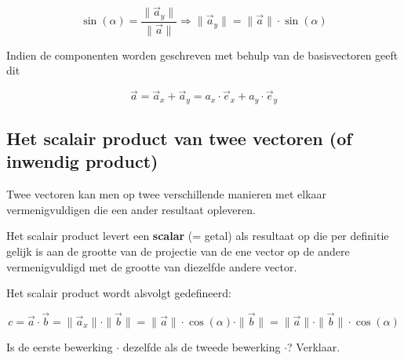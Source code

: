 \documentclass{ximera}
\begin{document}
\[
\sin(\alpha) = \frac{\| \vec{a}_y \|}{\| \vec{a} \|} \Rightarrow \| \vec{a}_y \| = \|\vec{a}\| \cdot \sin(\alpha)
\]

\begin{image}[0.3\textwidth]
\end{image}

Indien de componenten worden geschreven met behulp van de basisvectoren geeft dit 


$$
\vec{a} = \vec{a}_x + \vec{a}_y = a_x \cdot \vec{e}_x + a_y \cdot \vec{e}_y 
$$


\subsection*{Het scalair product van twee vectoren (of inwendig product)}

Twee vectoren kan men op twee verschillende manieren met elkaar vermenigvuldigen die een ander resultaat opleveren. 

Het scalair product levert een \textbf{scalar} (= getal) als resultaat op die per definitie gelijk is aan de grootte van de projectie van de ene vector op de andere vermenigvuldigd met de grootte van diezelfde andere vector. 

Het scalair product wordt alsvolgt gedefineerd: 

$$
c = \vec{a} \cdot \vec{b} = \| \vec{a}_x \| \cdot \|\vec{b}\| = \|\vec{a}\| \cdot \cos(\alpha) \cdot \|\vec{b}\| = \| \vec{a}\| \cdot \| \vec{b}\| \cdot \cos(\alpha)
$$

\begin{quickquestion}
    Is de eerste bewerking \(\cdot\) dezelfde als de tweede bewerking \(\cdot\)? Verklaar. 
\end{quickquestion}
\end{document}
